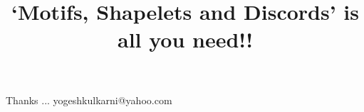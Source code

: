 \documentclass[xcolor=dvipsnames,compress,t,pdf,9pt]{beamer}
\title[\insertframenumber /\inserttotalframenumber]{`Motifs, Shapelets and Discords' is all you need!!}
\begin{document}
	\begin{frame}
	\titlepage
%
	\end{frame}
	
  
	
	
	\begin{frame}[c]{}
	Thanks ...
	\vspace{5mm}
	yogeshkulkarni@yahoo.com
	\end{frame}
\end{document}
